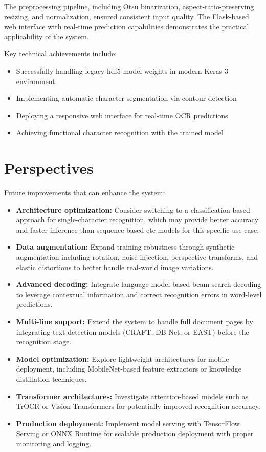 \documentclass[a4paper, oneside, 12pt, final]{extreport}
\begin{document}
The preprocessing pipeline, including Otsu binarization, aspect-ratio-preserving resizing,
and normalization, ensured consistent input quality. The Flask-based web interface with
real-time prediction capabilities demonstrates the practical applicability of the system.

Key technical achievements include:
\begin{itemize}
\item Successfully handling legacy \gls{hdf5} model weights in modern Keras 3 environment
\item Implementing automatic character segmentation via contour detection
\item Deploying a responsive web interface for real-time OCR predictions
\item Achieving functional character recognition with the trained model
\end{itemize}

\section*{Perspectives}

Future improvements that can enhance the system:

\begin{itemize}
\item \textbf{Architecture optimization:} Consider switching to a classification-based
approach for single-character recognition, which may provide better accuracy and faster
inference than sequence-based \gls{ctc} models for this specific use case.

\item \textbf{Data augmentation:} Expand training robustness through synthetic augmentation
including rotation, noise injection, perspective transforms, and elastic distortions to
better handle real-world image variations.

\item \textbf{Advanced decoding:} Integrate language model-based beam search decoding
to leverage contextual information and correct recognition errors in word-level predictions.

\item \textbf{Multi-line support:} Extend the system to handle full document pages by
integrating text detection models (CRAFT, DB-Net, or EAST) before the recognition stage.

\item \textbf{Model optimization:} Explore lightweight architectures for mobile deployment,
including MobileNet-based feature extractors or knowledge distillation techniques.

\item \textbf{Transformer architectures:} Investigate attention-based models such as
TrOCR or Vision Transformers for potentially improved recognition accuracy.

\item \textbf{Production deployment:} Implement model serving with TensorFlow Serving
or ONNX Runtime for scalable production deployment with proper monitoring and logging.
\end{itemize}
\end{document}
